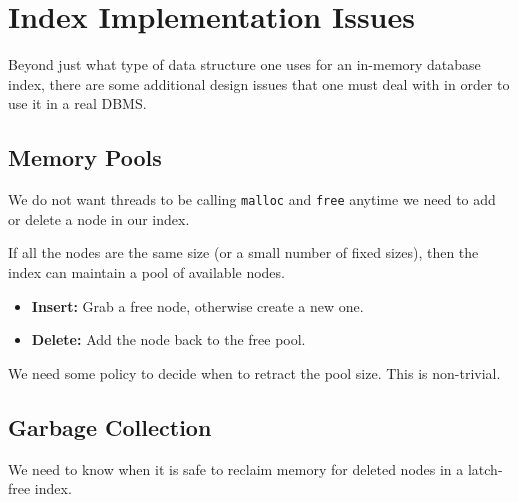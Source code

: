 \documentclass[11pt]{article}
\begin{document}
\maketitle
\thispagestyle{plain}

\section{Index Implementation Issues}
Beyond just what type of data structure one uses for an in-memory database index, there are some 
additional design issues that one must deal with in order to use it in a real DBMS.

\subsection*{Memory Pools}
We do not want threads to be calling \texttt{malloc} and \texttt{free} anytime we need to add 
or delete a node in our index.

If all the nodes are the same size (or a small number of fixed sizes), then the index can maintain 
a pool of available nodes. 
\begin{itemize}
    \item \textbf{Insert:}
    Grab a free node, otherwise create a new one.
    
    \item \textbf{Delete:}
    Add the node back to the free pool.
\end{itemize}

We need some policy to decide when to retract the pool size. This is non-trivial.

\subsection*{Garbage Collection}
We need to know when it is safe to reclaim memory for deleted nodes in a latch-free 
index.
\end{document}
